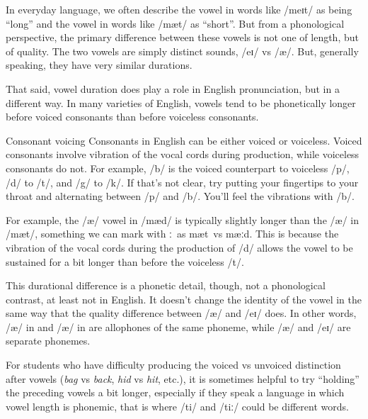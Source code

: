In everyday language, we often describe the vowel in words like  /meɪt/ as being \enquote{long} and the vowel in words like  /mæt/ as \enquote{short}. But from a phonological perspective, the primary difference between these vowels is not one of length, but of quality. The two vowels are simply distinct sounds, /eɪ/ vs /æ/. But, generally speaking, they have very similar durations.

That said, vowel duration does play a role in English pronunciation, but in a different way. In many varieties of English, vowels tend to be phonetically longer before voiced consonants than before voiceless consonants.

\begin{tblsframed}{Consonant voicing}
Consonants in English can be either voiced or voiceless. Voiced consonants involve vibration of the vocal cords during production, while voiceless consonants do not. For example, /b/ is the voiced counterpart to voiceless /p/, /d/ to /t/, and /g/ to /k/. If that's not clear, try putting your fingertips to your throat and alternating between /p/ and /b/. You'll feel the vibrations with /b/.
\end{tblsframed}

For example, the /æ/ vowel in  /mæd/ is typically slightly longer than the /æ/ in  /mæt/, something we can mark with \ob ː{\cb}~as \ob mæt{\cb}~vs \ob mæːd{\cb}. This is because the vibration of the vocal cords during the production of /d/ allows the vowel to be sustained for a bit longer than before the voiceless /t/.

This durational difference is a phonetic detail, though, not a phonological contrast, at least not in English. It doesn't change the identity of the vowel in the same way that the quality difference between /æ/ and /eɪ/ does. In other words, /æ/ in  and /æ/ in  are allophones of the same phoneme, while /æ/ and /eɪ/ are separate phonemes.

For students who have difficulty producing the voiced vs unvoiced distinction after vowels (\textit{ba\emph{g}} vs \textit{ba\emph{ck}}, \textit{hi\emph{d}} vs \textit{hi\emph{t}}, etc.), it is sometimes helpful to try ``holding'' the preceding vowels a bit longer, especially if they speak a language in which vowel length is phonemic, that is where /ti/ and /tiː/ could be different words.

